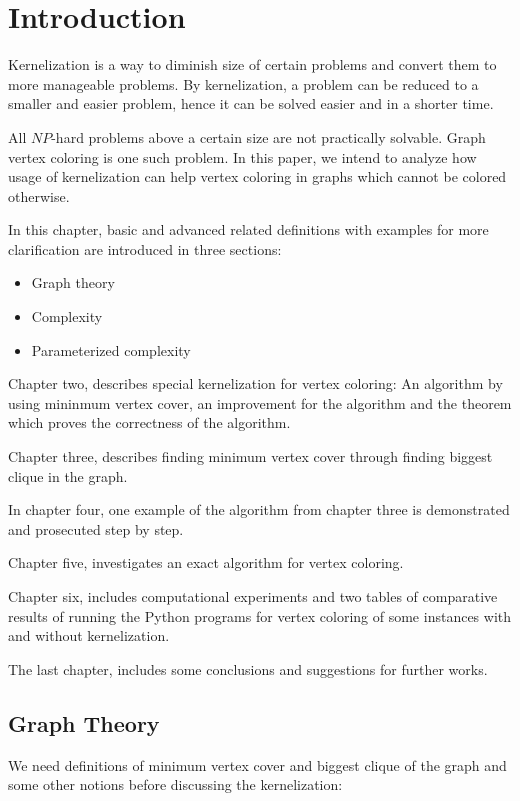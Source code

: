 \documentclass[12pt]{article}
\theoremstyle{slplain}
\begin{document}
\afterpage{\null\newpage}
\newpage
\setcounter{secnumdepth}{2}
\section{Introduction}
Kernelization is a way to diminish size of certain problems and convert them to more manageable problems. By kernelization, a problem can be reduced to a smaller and easier problem, hence it can be solved easier and in a shorter time. 

All $NP$-hard problems above a certain size are not practically solvable. Graph vertex coloring is one such problem. In this paper, we intend to analyze how usage of kernelization can help vertex coloring in graphs which cannot be colored otherwise.

In this chapter, basic and advanced related definitions with examples for more clarification are introduced in three sections:
\begin{itemize}
\item Graph theory
\item Complexity
\item Parameterized complexity
\end{itemize}

Chapter two, describes special kernelization for vertex coloring: An algorithm by using mininmum vertex cover, an improvement for the algorithm and the theorem which proves the correctness of the algorithm.

Chapter three, describes finding minimum vertex cover through finding biggest clique in the graph.

In chapter four, one example of the algorithm from chapter three is demonstrated and prosecuted step by step.

Chapter five, investigates an exact algorithm for vertex coloring.

Chapter six, includes computational experiments and two tables of comparative results of running the Python programs for vertex coloring of some instances with and without kernelization.

The last chapter, includes some conclusions and suggestions for further works.

\newpage
\subsection{Graph Theory}
We need definitions of minimum vertex cover and biggest clique of the graph and some other notions before discussing the kernelization:
\end{document}
